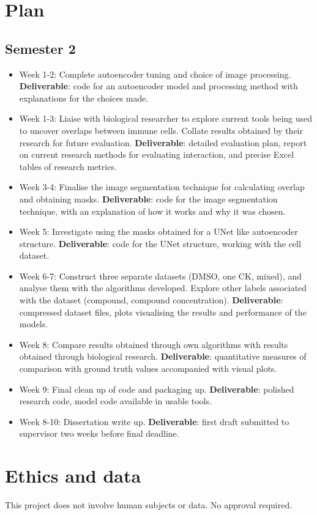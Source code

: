 \documentclass[11pt]{article}
\begin{document}
\section{Plan}\label{plan}

\subsection{Semester 2}

\begin{itemize}
    \tightlist
    \item
      Week 1-2: Complete autoencoder tuning and choice of image processing. \textbf{Deliverable}:
      code for an autoencoder model and processing method with explanations for the choices made.
    \item
      Week 1-3: Liaise with biological researcher to explore current tools being used to uncover overlaps between immune cells. Collate results obtained by their research for future evaluation. \textbf{Deliverable}: detailed evaluation plan, report on current research methods for evaluating interaction, and precise Excel tables of research metrics.
    \item
      Week 3-4: Finalise the image segmentation technique for calculating overlap and obtaining masks. \textbf{Deliverable}: code for the image segmentation technique, with an explanation of how it works and why it was chosen.
    \item
      Week 5: Investigate using the masks obtained for a UNet like autoencoder structure. \textbf{Deliverable}: code for the UNet structure, working with the cell dataset.
    \item
      Week 6-7: Construct three separate datasets (DMSO, one CK, mixed), and analyse them with the algorithms developed. Explore other labels associated with the dataset (compound, compound concentration). \textbf{Deliverable}: compressed dataset files, plots visualising the results and performance of the models.
    \item
      Week 8: Compare results obtained through own algorithms with results obtained through biological research.
      \textbf{Deliverable}: quantitative measures of comparison with ground truth values accompanied with visual plots.
    \item
      Week 9: Final clean up of code and packaging up.
      \textbf{Deliverable}: polished research code, model code available in usable tools.
    \item
      Week 8-10: Dissertation write up. \textbf{Deliverable}: first draft submitted to
      supervisor two weeks before final deadline.
    \end{itemize}


\section{Ethics and data}\label{ethics}

This project does not involve human subjects or data. No approval required.
\end{document}
